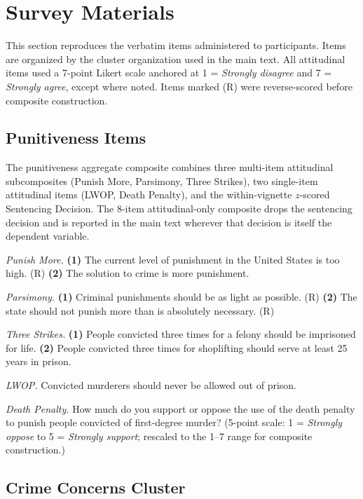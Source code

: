 \section{Survey Materials}
\label{sec:supp_materials}

This section reproduces the verbatim items administered to participants. Items are organized by the cluster organization used in the main text. All attitudinal items used a 7-point Likert scale anchored at 1 = \textit{Strongly disagree} and 7 = \textit{Strongly agree}, except where noted. Items marked (R) were reverse-scored before composite construction.

\subsection{Punitiveness Items}

The punitiveness aggregate composite combines three multi-item attitudinal subcomposites (Punish More, Parsimony, Three Strikes), two single-item attitudinal items (LWOP, Death Penalty), and the within-vignette $z$-scored Sentencing Decision. The 8-item attitudinal-only composite drops the sentencing decision and is reported in the main text wherever that decision is itself the dependent variable.

\textit{Punish More.} \textbf{(1)} The current level of punishment in the United States is too high. (R) \textbf{(2)} The solution to crime is more punishment.

\textit{Parsimony.} \textbf{(1)} Criminal punishments should be as light as possible. (R) \textbf{(2)} The state should not punish more than is absolutely necessary. (R)

\textit{Three Strikes.} \textbf{(1)} People convicted three times for a felony should be imprisoned for life. \textbf{(2)} People convicted three times for shoplifting should serve at least 25 years in prison.

\textit{LWOP.} Convicted murderers should never be allowed out of prison.

\textit{Death Penalty.} How much do you support or oppose the use of the death penalty to punish people convicted of first-degree murder? (5-point scale: 1 = \textit{Strongly oppose} to 5 = \textit{Strongly support}; rescaled to the 1--7 range for composite construction.)

\subsection{Crime Concerns Cluster}

